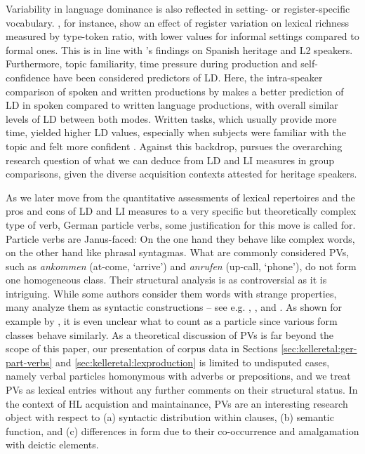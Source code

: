 \documentclass[output=paper,colorlinks,citecolor=brown]{langscibook}
\begin{document}
Variability in language dominance is also reflected in setting- or register\hyp specific vocabulary. \citet{VanGijselSpeelmanGeeraerts2005Richness}, for instance, show an effect of register variation on lexical richness measured by type-token ratio, with lower values for informal settings compared to formal ones. This is in line with \citet{Alamillo2019LexicalSkills}'s findings on Spanish heritage and L2 speakers. Furthermore, topic familiarity, time pressure during production and self-confidence have been considered predictors of LD. Here, the intra-speaker comparison of spoken and written productions by \citet{Yu2009LDWritingSpeaking} makes a better prediction of LD in spoken compared to written language productions, with overall similar levels of LD between both modes. Written tasks, which usually provide more time, yielded higher LD values, especially when subjects were familiar with the topic and felt more confident \citep[250]{Yu2009LDWritingSpeaking}. Against this backdrop,  pursues the overarching research question of what we can deduce from LD and LI measures in group comparisons, given the diverse acquisition contexts attested for heritage speakers.

As we later move from the quantitative assessments of lexical repertoires and the pros and cons of LD and LI measures to a very specific but theoretically complex type of verb, German particle verbs, some justification for this move is called for. Particle verbs are Janus-faced: On the one hand they behave like complex words, on the other hand like phrasal syntagmas. What are commonly considered PVs, such as \textit{ankommen} (at-come, `arrive') and \textit{anrufen} (up-call, `phone'), do not form one homogeneous class. Their structural analysis is as controversial as it is intriguing. While some authors consider them words with strange properties, many analyze them as syntactic constructions -- see e.g. \citet{Mueller2002}, \citet{Lüdeling2001ParticleVerbs}, and \citet{Felfe2012}. As shown for example by \citet{Lüdeling2001ParticleVerbs}, it is even unclear what to count as a particle since various form classes behave similarly. As a theoretical discussion of PVs is far beyond the scope of this paper, our presentation of corpus data in Sections \ref{sec:kelleretal:ger-part-verbs} and \ref{sec:kelleretal:lexproduction} is limited to undisputed cases, namely verbal particles homonymous with adverbs or prepositions, and we treat PVs as lexical entries without any further comments on their structural status. In the context of HL acquistion and maintainance, PVs are an interesting research object with respect to (a) syntactic distribution within clauses, (b) semantic function, and (c) differences in form due to their co-occurrence and amalgamation with deictic elements. 
\end{document}
